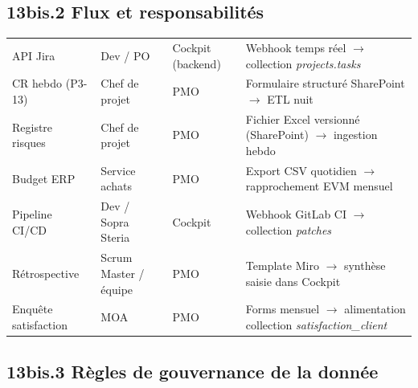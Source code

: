 \documentclass[11pt,a4paper,oneside]{report}
\begin{document}
\subsection*{13bis.2 Flux et responsabilités}

\renewcommand{\arraystretch}{1.3}
\begin{tabularx}{\textwidth}{L{3cm} L{3cm} L{3cm} Y}
\toprule
{} &  &  &  \\
\midrule
API Jira           & Dev / PO              & Cockpit (backend) & Webhook temps réel $\rightarrow$ collection \textit{projects.tasks} \\
CR hebdo (P3-13)   & Chef de projet        & PMO               & Formulaire structuré SharePoint $\rightarrow$ ETL nuit \\
Registre risques   & Chef de projet        & PMO               & Fichier Excel versionné (SharePoint) $\rightarrow$ ingestion hebdo \\
Budget ERP         & Service achats        & PMO               & Export CSV quotidien $\rightarrow$ rapprochement EVM mensuel \\
Pipeline CI/CD     & Dev / Sopra Steria    & Cockpit           & Webhook GitLab CI $\rightarrow$ collection \textit{patches} \\
Rétrospective      & Scrum Master / équipe & PMO               & Template Miro $\rightarrow$ synthèse saisie dans Cockpit \\
Enquête satisfaction & MOA                 & PMO               & Forms mensuel $\rightarrow$ alimentation collection \textit{satisfaction\_client} \\
\bottomrule
\end{tabularx}

\subsection*{13bis.3 Règles de gouvernance de la donnée}
\end{document}

